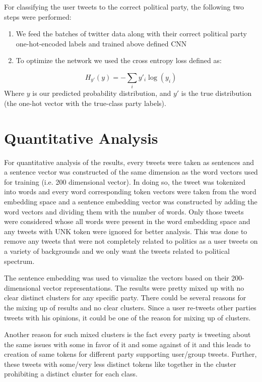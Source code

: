 \documentclass[10pt, oneside]{article}
\begin{document}
\begin{multicols}{2}
For classifying the user tweets to the correct political party, the following two steps were performed:
\begin{enumerate}
	\item We feed the batches of twitter data along with their correct political party one-hot-encoded labels and trained above defined CNN 
	\item To optimize the network we used the cross entropy loss defined as:
\end{enumerate}
\begin{equation}
H_{y'}(y) = - \sum_{i} y'_{i} \log (y_{i})
\end{equation}
Where $y$ is our predicted probability distribution, and $y'$ is the true distribution (the one-hot vector with the true-class party labels). 


\section{Quantitative Analysis}

For quantitative analysis of the results, every tweets were taken as sentences and a sentence vector was constructed of the same dimension as the word vectors used for training (i.e. 200 dimensional vector). In doing so, the tweet was tokenized into words and every word corresponding token vectors were taken from the word embedding space and a sentence embedding vector was constructed by adding the word vectors and dividing them with the number of words. Only those tweets were considered whose all words were present in the word embedding space and any tweets with UNK token were ignored for better analysis. This was done to remove any tweets that were not completely related to politics as a user tweets on a variety of backgrounds and we only want the tweets related to political spectrum. 

The sentence embedding was used to visualize the vectors based on their 200-dimensional vector representations. The results were pretty mixed up with no clear distinct clusters for any specific party. There could be several reasons for the mixing up of results and no clear clusters. Since a user re-tweets other parties tweets with his opinions, it could be one of the reason for mixing up of clusters. 

Another reason for such mixed clusters is the fact every party is tweeting about the same issues with some in favor of it and some against of it and this leads to creation of same tokens for different party supporting user/group tweets. Further, these tweets with some/very less distinct tokens like together in the cluster prohibiting a distinct cluster for each class.


\end{multicols}
\end{document}
